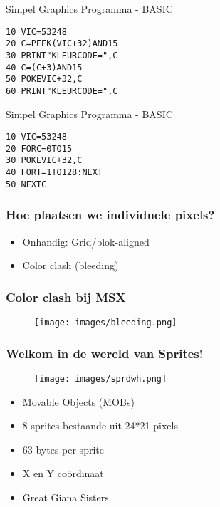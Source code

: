 
\begin{frame}[fragile]{Simpel Graphics Programma - BASIC}

\begin{lstlisting}
10 VIC=53248
20 C=PEEK(VIC+32)AND15
30 PRINT"KLEURCODE=",C
40 C=(C+3)AND15
50 POKEVIC+32,C
60 PRINT"KLEURCODE=",C
\end{lstlisting}

\end{frame}


\begin{frame}[fragile]{Simpel Graphics Programma - BASIC}

\begin{lstlisting}
10 VIC=53248
20 FORC=0TO15
30 POKEVIC+32,C
40 FORT=1TO128:NEXT
50 NEXTC
\end{lstlisting}

\end{frame}


\begin{frame}
\frametitle{Hoe plaatsen we individuele pixels?}

\begin{itemize}
\item Onhandig: Grid/blok-aligned
\item Color clash (bleeding)
\end{itemize}

\end{frame}


\begin{frame}
\frametitle{Color clash bij MSX}

\begin{figure}
\texttt{[image: images/bleeding.png]}
\end{figure}

\end{frame}


\begin{frame}
\frametitle{Welkom in de wereld van Sprites!}

\begin{figure}
\texttt{[image: images/sprdwh.png]}
\end{figure}

\begin{itemize}
\item Movable Objects (MOBs)
\item 8 sprites bestaande uit 24*21 pixels
\item 63 bytes per sprite
\item X en Y co\"ordinaat
\item Great Giana Sisters
\end{itemize}

\end{frame}

